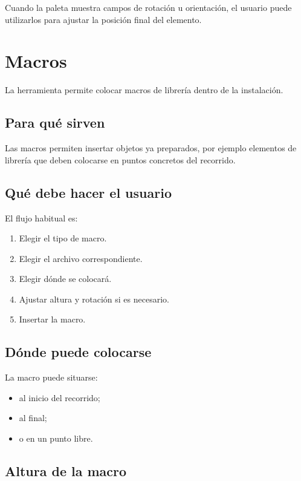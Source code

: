 Cuando la paleta muestra campos de rotación u orientación, el usuario puede utilizarlos para ajustar la posición final del elemento.


\section{Macros}

La herramienta permite colocar macros de librería dentro de la instalación.

\subsection{Para qué sirven}

Las macros permiten insertar objetos ya preparados, por ejemplo elementos de librería que deben colocarse en puntos concretos del recorrido.

\subsection{Qué debe hacer el usuario}

El flujo habitual es:

\begin{enumerate}
\item Elegir el tipo de macro.
\item Elegir el archivo correspondiente.
\item Elegir dónde se colocará.
\item Ajustar altura y rotación si es necesario.
\item Insertar la macro.
\end{enumerate}

\subsection{Dónde puede colocarse}

La macro puede situarse:

\begin{itemize}
\item al inicio del recorrido;
\item al final;
\item o en un punto libre.
\end{itemize}

\subsection{Altura de la macro}

